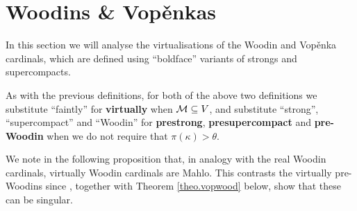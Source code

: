 \documentclass[../../main]{subfiles}
\begin{document}
\section{Woodins \& Vop\v enkas}

In this section we will analyse the virtualisations of the Woodin and Vop\v enka cardinals, which are defined using ``boldface'' variants of strongs and supercompacts.



As with the previous definitions, for both of the above two definitions we substitute ``faintly'' for \textbf{virtually} when $\operatorname{\mathcal M}\subseteq V$, and substitute ``strong'', ``supercompact'' and ``Woodin'' for \textbf{prestrong}, \textbf{presupercompact} and \textbf{pre-Woodin} when we do not require that $\pi(\kappa)>\theta$.

\qquad We note in the following proposition that, in analogy with the real Woodin cardinals, virtually Woodin cardinals are Mahlo. This contrasts the virtually pre-Woodins since \cite{WilsonVopenka}, together with Theorem \ref{theo.vopwood} below, show that these can be singular.
\end{document}
